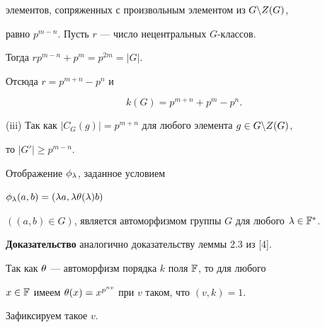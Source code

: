 элементов, сопряженных с произвольным элементом из $G\backslash Z(G)$,


равно $p^{m-n}$. Пусть $r$ --- число нецентральных $G$-классов.


Тогда $rp^{m-n}+p^m=p^{2m}=|G|$. 


Отсюда $r=p^{m+n}-p^n$ и


$$


k(G)=p^{m+n}+p^m-p^n.


$$





(iii) Так как $|C_G(g)|=p^{m+n}$ для любого элемента $g\in G\backslash Z(G)$,


то $|G'|\ge p^{m-n}$. 








\begin{lem}


Отображение $\phi_\lambda$, заданное условием


$\phi_\lambda(a,b)=(\lambda a,\lambda\theta(\lambda)b)$


$((a,b)\in G)$, является автоморфизмом группы $G$ для любого $\lambda\in\Bbb F^*$.


\end{lem}








{\bf Доказательство} аналогично доказательству леммы 2.3 из [4].








Так как $\theta$ --- автоморфизм порядка $k$ поля $\Bbb F$, то для любого


$x\in \Bbb F$ имеем $\theta(x)=x^{p^{nv}}$ при $v$ таком, что $(v,k)=1$.


Зафиксируем такое $v$.








